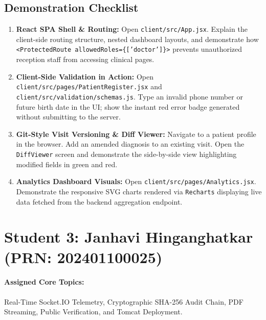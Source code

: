 \documentclass[12pt,a4paper,oneside]{report}
\begin{document}
\subsection{Demonstration Checklist}
\begin{enumerate}
    \item \textbf{React SPA Shell \& Routing:} Open \texttt{client/src/App.jsx}. Explain the client-side routing structure, nested dashboard layouts, and demonstrate how \texttt{<ProtectedRoute allowedRoles=\{['doctor']\}>} prevents unauthorized reception staff from accessing clinical pages.
    \item \textbf{Client-Side Validation in Action:} Open \texttt{client/src/pages/PatientRegister.jsx} and \texttt{client/src/validation/schemas.js}. Type an invalid phone number or future birth date in the UI; show the instant red error badge generated without submitting to the server.
    \item \textbf{Git-Style Visit Versioning \& Diff Viewer:} Navigate to a patient profile in the browser. Add an amended diagnosis to an existing visit. Open the \texttt{DiffViewer} screen and demonstrate the side-by-side view highlighting modified fields in green and red.
    \item \textbf{Analytics Dashboard Visuals:} Open \texttt{client/src/pages/Analytics.jsx}. Demonstrate the responsive SVG charts rendered via \texttt{Recharts} displaying live data fetched from the backend aggregation endpoint.
\end{enumerate}

\section{Student 3: Janhavi Hinganghatkar (PRN: 202401100025)}
\paragraph{Assigned Core Topics:} Real-Time Socket.IO Telemetry, Cryptographic SHA-256 Audit Chain, PDF Streaming, Public Verification, and Tomcat Deployment.
\end{document}
